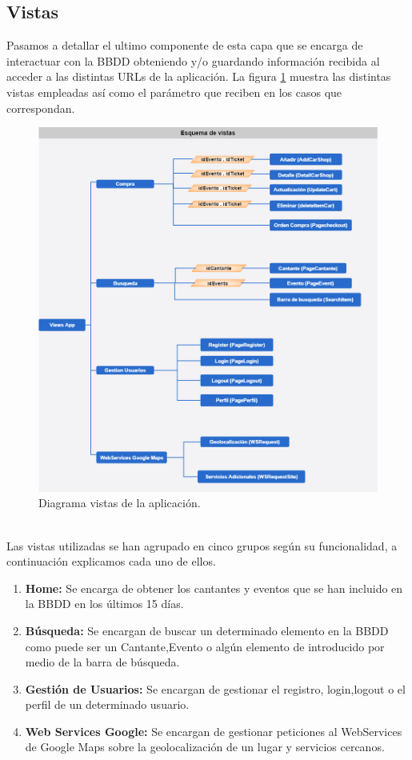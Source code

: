 \subsection*{Vistas}
Pasamos a detallar el ultimo componente de esta capa que se encarga de interactuar con la BBDD obteniendo y/o guardando información recibida al acceder a las distintas URLs de la aplicación. La figura \ref{fig:diagrama_vistas} muestra las distintas vistas empleadas así como el parámetro que reciben en los casos que correspondan.
\begin{figure}[!h]
\begin{center}
   \includegraphics[width=0.7\linewidth]{Figures/diagrama_vistas}
  \decoRule
  \caption[Diagrama vistas de la aplicación.]{Diagrama vistas de la aplicación.}
\label{fig:diagrama_vistas}
\end{center}
\end{figure}
\\Las vistas utilizadas se han agrupado en cinco grupos según su funcionalidad, a continuación explicamos cada uno de ellos.
\begin{enumerate}
\item \textbf{Home:} Se encarga de obtener los cantantes y eventos que se han incluido en la BBDD en los últimos 15 días.
\item \textbf{Búsqueda:} Se encargan de buscar un determinado elemento en la BBDD como puede ser un Cantante,Evento o algún elemento de introducido por medio de la barra de búsqueda.
\item \textbf{Gestión de Usuarios:} Se encargan de gestionar el registro, login,logout o el perfil de un determinado usuario.
\item \textbf{Web Services Google:} Se encargan de gestionar peticiones al WebServices de Google Maps sobre la geolocalización de un lugar y servicios cercanos.
\end{enumerate}
